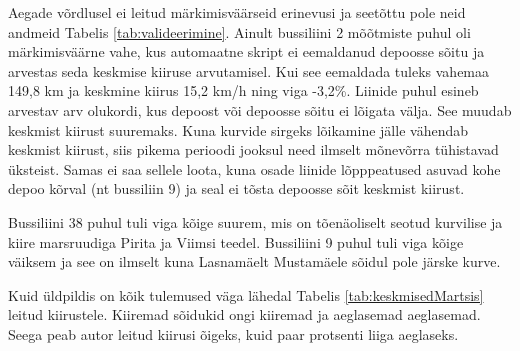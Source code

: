 Aegade võrdlusel ei leitud märkimisväärseid erinevusi ja seetõttu pole neid andmeid Tabelis \ref{tab:valideerimine}. Ainult bussiliini 2 mõõtmiste puhul oli märkimisväärne vahe, kus automaatne skript ei eemaldanud depoosse sõitu ja arvestas seda keskmise kiiruse arvutamisel. Kui see eemaldada tuleks vahemaa 149,8 km ja keskmine kiirus 15,2 km/h ning viga -3,2\%.
Liinide puhul esineb arvestav arv olukordi, kus depoost või depoosse sõitu ei lõigata välja. See muudab keskmist kiirust suuremaks. Kuna kurvide sirgeks lõikamine jälle vähendab keskmist kiirust, siis pikema perioodi jooksul need ilmselt mõnevõrra tühistavad üksteist. Samas ei saa sellele loota, kuna osade liinide lõpppeatused asuvad kohe depoo kõrval (nt bussiliin 9) ja seal ei tõsta depoosse sõit keskmist kiirust.

Bussiliini 38 puhul tuli viga kõige suurem, mis on tõenäoliselt seotud kurvilise ja kiire marsruudiga Pirita ja Viimsi teedel. Bussiliini 9 puhul tuli viga kõige väiksem ja see on ilmselt kuna Lasnamäelt Mustamäele sõidul pole järske kurve. 

Kuid üldpildis on kõik tulemused väga lähedal Tabelis \ref{tab:keskmisedMartsis} leitud kiirustele. Kiiremad sõidukid ongi kiiremad ja aeglasemad aeglasemad. Seega peab autor leitud kiirusi õigeks, kuid paar protsenti liiga aeglaseks.
